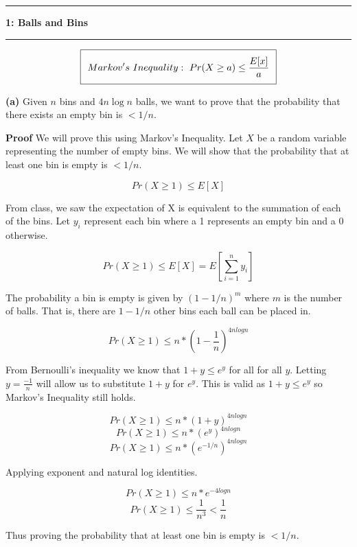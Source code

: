 \documentclass[11pt]{article}
\newcommand\question[2]{\vspace{.25in}\hrule\textbf{#1: #2}\vspace{.5em}\hrule\vspace{.10in}}
\renewcommand\part[1]{\vspace{.10in}\textbf{(#1)}}
\begin{document}
\raggedright
\newcommand\NAME{Jake Pitkin}  %
\newcommand\UID{u0891770}     %
\newcommand\HWNUM{5}              %

\question{1}{Balls and Bins}
\begin{equation}
\setlength\fboxsep{0.25cm}
\setlength\fboxrule{0.4pt}
\boxed{Markov's \ Inequality: \ Pr(X \geq a) \leq \frac{E[x]}{a}}
\end{equation}

\part{a} Given $n$ bins and $4 n \log n$ balls, we want to prove that the probability that there exists an empty bin is $< 1/n$.

\textbf{Proof} We will prove this using Markov's Inequality. Let $X$ be a random variable representing the number of empty bins. We will show that the probability that at least one bin is empty is $< 1/n$.

$$Pr(X \geq 1) \leq E[X]$$

From class, we saw the expectation of X is equivalent to the summation of each of the bins. Let $y_i$ represent each bin where a 1 represents an empty bin and a 0 otherwise.

$$Pr(X \geq 1) \leq E[X] = E[\sum_{i = 1}^n y_i]$$

The probability a bin is empty is given by $(1 - 1/n)^m$ where $m$ is the number of balls. That is, there are $1 - 1/n$ other bins each ball can be placed in. 

$$Pr(X \geq 1) \leq n * (1 - \frac{1}{n})^{4 n log n}$$

From Bernoulli's inequality we know that $1 + y \leq e^y$ for all for all $y$. Letting $y = \frac{-1}{n}$ will allow us to substitute $1 + y$ for $e^y$. This is valid as $1 + y \leq e^y$ so Markov's Inequality still holds.

$$Pr(X \geq 1) \leq n * (1 + y)^{4 n log n}$$
$$Pr(X \geq 1) \leq n * (e^{y})^{4 n log n}$$
$$Pr(X \geq 1) \leq n * (e^{-1/n})^{4 n log n}$$

Applying exponent and natural log identities.

$$Pr(X \geq 1) \leq n * e^{-4 log n}$$
$$Pr(X \geq 1) \leq \frac{1}{n^3} < \frac{1}{n}$$

Thus proving the probability that at least one bin is empty is $< 1/n$.
\end{document}
